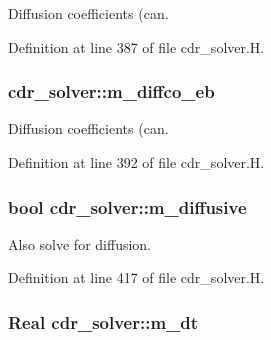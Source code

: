 Diffusion coefficients (can. 



Definition at line 387 of file cdr\+\_\+solver.\+H.

\subsubsection[{\texorpdfstring{m\+\_\+diffco\+\_\+eb}{m_diffco_eb}}]{ cdr\+\_\+solver\+::m\+\_\+diffco\+\_\+eb\hspace{0.3cm}{\ttfamily [protected]}}\hypertarget{classcdr__solver_a4fd316c26ea70c15bbac01ab2d8b41f3}{}\label{classcdr__solver_a4fd316c26ea70c15bbac01ab2d8b41f3}


Diffusion coefficients (can. 



Definition at line 392 of file cdr\+\_\+solver.\+H.

\subsubsection[{\texorpdfstring{m\+\_\+diffusive}{m_diffusive}}]{\setlength{\rightskip}{0pt plus 5cm}bool cdr\+\_\+solver\+::m\+\_\+diffusive\hspace{0.3cm}{\ttfamily [protected]}}\hypertarget{classcdr__solver_a6368305ae006773465b2cdcab7d48031}{}\label{classcdr__solver_a6368305ae006773465b2cdcab7d48031}


Also solve for diffusion. 



Definition at line 417 of file cdr\+\_\+solver.\+H.

\subsubsection[{\texorpdfstring{m\+\_\+dt}{m_dt}}]{\setlength{\rightskip}{0pt plus 5cm}Real cdr\+\_\+solver\+::m\+\_\+dt\hspace{0.3cm}{\ttfamily [protected]}}\hypertarget{classcdr__solver_a33b1498669b7481446b328d8d56a1f77}{}\label{classcdr__solver_a33b1498669b7481446b328d8d56a1f77}


